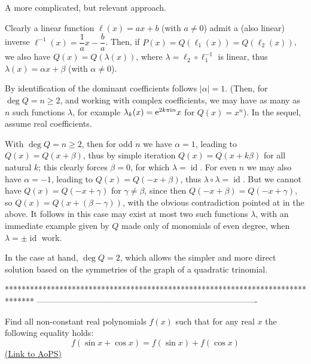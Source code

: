 \begin{solution}
	A more complicated, but relevant approach.

Clearly a linear function $\ell(x) = ax+b$ (with $a\neq 0$) admit a (also linear) inverse $\ell^{-1}(x) = \dfrac {1} {a} x - \dfrac {b} {a}$. Then, if $P(x)=Q(\ell_1(x)) = Q(\ell_2(x))$, we also have $Q(x) = Q(\lambda(x))$, where $\lambda = \ell_2\circ \ell_1^{-1}$ is linear, thus $\lambda(x) = \alpha x + \beta$ (with $\alpha \neq 0$).

By identification of the dominant coefficients follows $|\alpha|=1$. (Then, for $\deg Q = n\geq 2$, and working with complex coefficients, we may have as many as $n$ such functions $\lambda$, for example $\lambda_k(x) = \textrm{e}^{2k\pi\textrm{i}\/n} x$ for $Q(x) = x^n$). In the sequel, assume real coefficients.

With $\deg Q = n\geq 2$, then for odd $n$ we have $\alpha=1$, leading to $Q(x) = Q(x+\beta)$, thus by simple iteration $Q(x) = Q(x+k\beta)$ for all natural $k$; this clearly forces $\beta = 0$, for which $\lambda = \operatorname{id}$. For even $n$ we may also have $\alpha=-1$, leading to $Q(x) = Q(-x+\beta)$, thus $\lambda \circ \lambda = \operatorname{id}$. But we cannot have $Q(x) = Q(-x+\gamma)$ for $\gamma \neq \beta$, since then $Q(-x+\beta) =  Q(-x+\gamma)$, so $Q(x) =  Q(x+(\beta -\gamma))$, with the obvious contradiction pointed at in the above. It follows in this case may exist at most two such functions $\lambda$, with an immediate example given by $Q$ made only of monomials of even degree, when $\lambda = \pm \operatorname{id}$ work.

In the case at hand, $\deg Q = 2$, which allows the simpler and more direct solution based on the symmetries of the graph of a quadratic trinomial.
\end{solution}
*******************************************************************************
-------------------------------------------------------------------------------

\begin{problem}
	Find all non-constant real polynomials $f (x)$ such that for any real $x$ the following equality
holds:
\[f (\sin x + \cos x) = f (\sin x) + f (\cos x)\]
	\flushright \href{https://artofproblemsolving.com/community/c6h598639}{(Link to AoPS)}
\end{problem}



